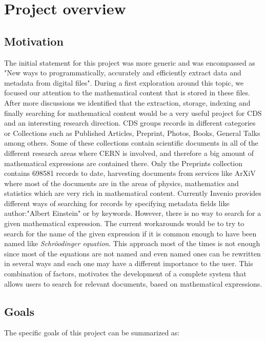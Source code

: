 \section{Project overview}
\subsection{Motivation}
The initial statement for this project was more generic and was encompassed as "New ways to programmatically, accurately and efficiently extract data and metadata from digital files". During a first exploration around this topic, we focused our attention to the mathematical content that is stored in these files. After more discussions we identified that the extraction, storage, indexing and finally searching for mathematical content would be a very useful project for CDS and an interesting research direction. CDS groups records in different categories or Collections such as Published Articles, Preprint, Photos, Books, General Talks among others. Some of these collections contain scientific documents in all of the different research areas where CERN is involved, and therefore a big amount of mathematical expressions are contained there. Only the Preprints collection contains 698581 records to date, harvesting documents from services like ArXiV\cite{arxiv} where most of the documents are in the areas of physics, mathematics and statistics which are very rich in mathematical content.
Currently Invenio provides different ways of searching for records by specifying metadata fields like author:"Albert Einstein" or by keywords. However, there is no way to search for a given mathematical expression. The current workarounds would be to try to search for the name of the given expression if it is common enough to have been named like \emph{Schr\"oodinger equation}. This approach most of the times is not enough since most of the equations are not named and even named ones can be rewritten in several ways and each one may have a different importance to the user. This combination of factors, motivates the development of a complete system that allows users to search for relevant documents, based on mathematical expressions.

\subsection{Goals}

The specific goals of this project can be summarized as:

